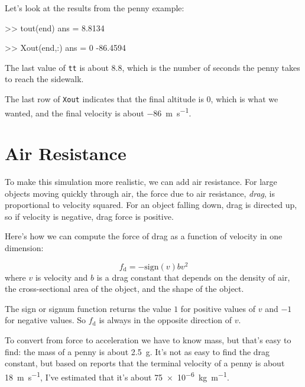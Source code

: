 \documentclass[../../book.tex]{subfiles}
\begin{document}
Let's look at the results from the penny example:

\begin{code}
    >> tout(end)
    ans =
    8.8134
    
    >> Xout(end,:)
    ans =
             0  -86.4594
\end{code}

The last value of \lstinline{tt} is about 8.8, which is the number of seconds the penny takes to reach the sidewalk.

The last row of \lstinline{Xout} indicates that the final altitude is 0, which is what we wanted, and the final velocity is about \SI{-86}{\meter \per \second}.


\section{Air Resistance}
\label{air_resistance}


To make this simulation more realistic, we can add air resistance.
For large objects moving quickly through air, the force due to air resistance, \emph{drag}, is proportional to velocity squared.
For an object falling down, drag is
directed up, so if velocity is negative, drag force is positive.


Here's how we can compute the force of drag as a function of velocity in one dimension:

\begin{equation*}
    f_\mathrm{d} = -\mathrm{sign}(v) b v^2
\end{equation*}
where $v$ is velocity and
$b$ is a drag constant that depends on the density of
air, the cross-sectional area of the object, and the shape
of the object.

The sign or signum function returns the value $1$ for positive values of
$v$ and $-1$ for negative values.  So $f_\mathrm{d}$ is always in the opposite direction of $v$.


To convert from force to acceleration we have to know mass, but that's easy to find: the mass of a penny is about \SI{2.5}{\gram}.  It's not as easy to find the drag constant, but based on reports that the terminal velocity of a penny is about \SI{18}{\meter \per \second}, I've estimated that it's about \SI{75e-6}{\kilogram \per \meter}.
\end{document}
